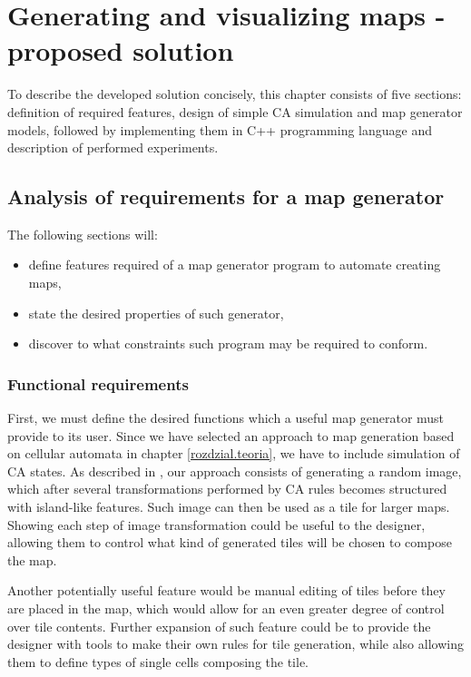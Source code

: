 \documentclass[12pt]{report}
\begin{document}
\chapter{Generating and visualizing maps - proposed solution} \label{rozdzial.praktyka} 

To describe the developed solution concisely, this chapter consists of five sections: definition of required features, design of simple CA simulation and map generator models, followed by implementing them in C++ programming language and description of performed experiments.

\section{Analysis of requirements for a map generator}
 
 The following sections will:
 
\begin{itemize}
	\item define features required of a map generator program to automate creating maps,
	\item state the desired properties of such generator,
	\item discover to what constraints such program may be required to conform.
\end{itemize}

\subsection{Functional requirements}

First, we must define the desired functions which a useful map generator must provide to its user.
Since we have selected an approach to map generation based on cellular automata in chapter \ref{rozdzial.teoria}, we have to include simulation of CA states. As described in \autocite{johnson2010cellular}, our approach consists of generating a random image, which after several transformations performed by CA rules becomes structured with island-like features. Such image can then be used as a tile for larger maps. Showing each step of image transformation could be useful to the designer, allowing them to control what kind of generated tiles will be chosen to compose the map. 

Another potentially useful feature would be manual editing of tiles before they are placed in the map, which would allow for an even greater degree of control over tile contents. Further expansion of such feature could be to provide the designer with tools to make their own rules for tile generation, while also allowing them to define types of single cells composing the tile.
\end{document}

